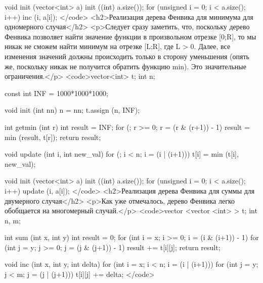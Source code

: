 void init (vector<int> a)
{
	init ((int) a.size());
	for (unsigned i = 0; i < a.size(); i++)
		inc (i, a[i]);
}</code>
<h2>Реализация дерева Фенвика для минимума для одномерного случая</h2>
<p>Следует сразу заметить, что, поскольку дерево Фенвика позволяет найти значение функции в произвольном отрезке [0;R], то мы никак не сможем найти минимум на отрезке [L;R], где L > 0. Далее, все изменения значений должны происходить только в сторону уменьшения (опять же, поскольку никак не получится обратить функцию min). Это значительные ограничения.</p>
<code>vector<int> t;
int n;

const int INF = 1000*1000*1000;

void init (int nn)
{
	n = nn;
	t.assign (n, INF);
}

int getmin (int r)
{
	int result = INF;
	for (; r >= 0; r = (r & (r+1)) - 1)
		result = min (result, t[r]);
	return result;
}

void update (int i, int new_val)
{
	for (; i < n; i = (i | (i+1)))
		t[i] = min (t[i], new_val);
}

void init (vector<int> a)
{
	init ((int) a.size());
	for (unsigned i = 0; i < a.size(); i++)
		update (i, a[i]);
}</code>
<h2>Реализация дерева Фенвика для суммы для двумерного случая</h2>
<p>Как уже отмечалось, дерево Фенвика легко обобщается на многомерный случай.</p>
<code>vector <vector <int> > t;
int n, m;

int sum (int x, int y)
{
	int result = 0;
	for (int i = x; i >= 0; i = (i & (i+1)) - 1)
		for (int j = y; j >= 0; j = (j & (j+1)) - 1)
			result += t[i][j];
	return result;
}

void inc (int x, int y, int delta)
{
	for (int i = x; i < n; i = (i | (i+1)))
		for (int j = y; j < m; j = (j | (j+1)))
			t[i][j] += delta;
}</code>